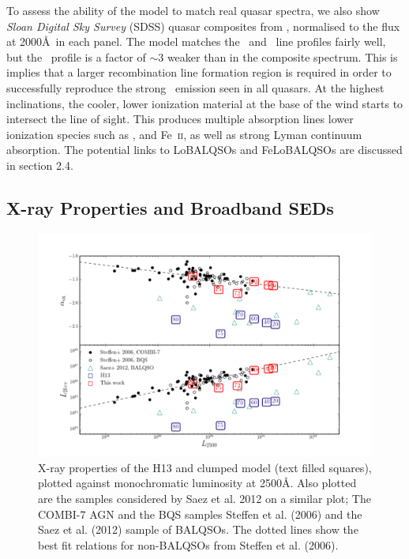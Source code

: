\documentclass[useAMS,usenatbib]{mn2e_x}
\begin{document}
To assess the ability of the model to match real 
quasar spectra, we also show {\sl Sloan Digital Sky Survey} (SDSS) quasar composites from
\cite{reichard2003}, normalised to the flux at 2000\AA\ in each panel.
The model matches the \civ\ and \mg\ line profiles fairly well, 
but the \la\ profile is a factor of $\sim3$ weaker than in the composite spectrum.
This is implies that a larger recombination line formation region is required in order 
to successfully reproduce the strong \la\ emission seen in 
all quasars. At the highest inclinations, the 
cooler, lower ionization material at the base of the wind
starts to intersect the line of sight. This produces 
multiple absorption lines lower ionization species such as \mg,
\al and Fe~\textsc{ii}, as well as strong Lyman continuum absorption.
The potential links to LoBALQSOs and FeLoBALQSOs are discussed in section 2.4.


\subsection{X-ray Properties and Broadband SEDs}

\begin{figure} %
\centering
\includegraphics[width=1.0\textwidth]{figures/alpha_ox_both.png}
\caption
{
X-ray properties of the H13 and clumped model (text filled 
squares), plotted against monochromatic luminosity 
at 2500\AA. Also plotted are the samples considered by
Saez et al. 2012 on a similar plot; The COMBI-7 AGN and
the BQS samples Steffen et al. (2006) and the Saez et al. (2012) sample of BALQSOs.
The dotted lines show the best fit relations for non-BALQSOs from Steffen et al. (2006).
}
\label{fig:xray}
\end{figure} %
\end{document}
